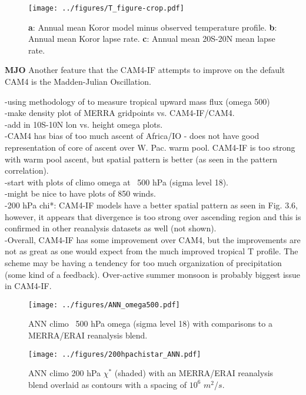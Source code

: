 \documentclass[letterpaper,12pt,titlepage,oneside,final]{book}
\begin{document}
\begin{figure}[H]
\centering
\noindent\texttt{[image: ../figures/T\_figure-crop.pdf]}\hfill
\caption{\textbf{a}: Annual mean Koror model minus observed temperature profile. \textbf{b}: Annual mean Koror lapse rate. \textbf{c}: Annual mean 20S-20N mean lapse rate.}
\end{figure}


\textbf{MJO}
Another feature that the CAM4-IF attempts to improve on the default CAM4 is the Madden-Julian Oscillation. 

-using methodology of \cite{vecchi_global_2007} to measure tropical upward mass flux (omega 500)
\\
-make density plot of MERRA gridpoints vs. CAM4-IF/CAM4. 
\\
-add in 10S-10N lon vs. height omega plots.
\\
-CAM4 has bias of too much ascent of Africa/IO - does not have good representation of core of ascent over W. Pac. warm pool. CAM4-IF is too strong with warm pool ascent, but spatial pattern is better (as seen in the pattern correlation).
\\
-start with plots of climo omega at ~500 hPa (sigma level 18).
\\
-might be nice to have plots of 850 winds.
\\
-200 hPa chi*: CAM4-IF models have a better spatial pattern as seen in Fig. 3.6, however, it appears that divergence is too strong over ascending region and this is confirmed in other reanalysis datasets as well (not shown).
\\
-Overall, CAM4-IF has some improvement over CAM4, but the improvements are not as great as one would expect from the much improved tropical T profile. The scheme may be having a tendency for too much organization of precipitation (some kind of a feedback). Over-active summer monsoon is probably biggest issue in CAM4-IF.
\\
\begin{figure}[H]
\centering
\noindent\texttt{[image: ../figures/ANN\_omega500.pdf]}\hfill
\caption{ANN climo ~500 hPa omega (sigma level 18) with comparisons to a MERRA/ERAI reanalysis blend.}
\end{figure}
\newpage
\begin{figure}[H]
\centering
\noindent\texttt{[image: ../figures/200hpachistar\_ANN.pdf]}\hfill
\caption{ANN climo 200 hPa $\chi^{*}$ (shaded) with an MERRA/ERAI reanalysis blend overlaid as contours with a spacing of $10^{6}$ $m^{2}$/$s$.}
\end{figure}
\end{document}
